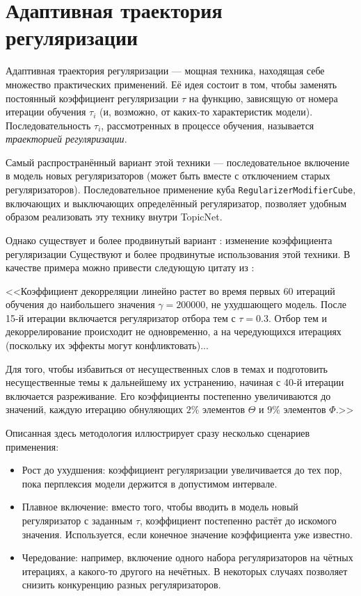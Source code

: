\section{Адаптивная траектория регуляризации}

Адаптивная траектория регуляризации --- мощная техника, находящая себе множество практических применений. Её идея состоит в том, чтобы заменять постоянный коэффициент регуляризации $\tau$ на функцию, зависящую от номера итерации обучения $\tau_i$ (и, возможно, от каких-то характеристик модели). Последовательность $\tau_i$, рассмотренных в процессе обучения, называется \textit{траекторией регуляризации}.

Самый распространённый вариант этой техники --- последовательное включение в модель новых регуляризаторов (может быть вместе с отключением старых регуляризаторов). Последовательное применение куба \texttt{RegularizerModifierCube}, включающих и выключающих определённый регуляризатор, позволяет удобным образом реализовать эту технику внутри TopicNet.

Однако существует и более продвинутый вариант : изменение коэффициента регуляризации
Существуют и более продвинутые использования этой техники. В качестве примера можно привести следующую цитату из \cite{plavin}:

<<Коэффициент декорреляции линейно растет во время первых
60 итераций обучения до наибольшего значения $\gamma = 200000$, не ухудшающего модель. После 15-й итерации включается регуляризатор отбора тем с $\tau=0.3$. Отбор тем и декоррелирование происходит не одновременно, а на чередующихся итерациях (поскольку их эффекты могут конфликтовать)... 

Для того, чтобы избавиться от несущественных слов в темах и подготовить несущественные темы к дальнейшему их устранению, начиная с 40-й итерации включается разреживание. Его коэффициенты постепенно увеличиваются до значений, каждую итерацию обнуляющих $2\%$ элементов $\Theta$ и $9\%$ элементов $\Phi$.>>

Описанная здесь методология иллюстрирует сразу несколько сценариев применения:

\begin{itemize}
    \item Рост до ухудшения: коэффициент регуляризации увеличивается до тех пор, пока перплексия модели держится в допустимом интервале.
    \item Плавное включение: вместо того, чтобы вводить в модель новый регуляризатор с заданным $\tau$, коэффициент постепенно растёт до искомого значения. Используется, если конечное значение коэффициента уже известно.
    \item Чередование: например, включение одного набора регуляризаторов на чётных итерациях, а какого-то другого на нечётных. В некоторых случаях позволяет снизить конкуренцию разных регуляризаторов.
\end{itemize}

